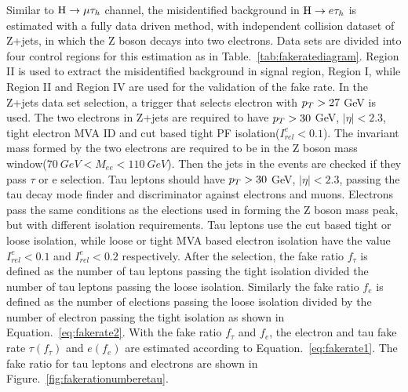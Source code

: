 Similar to $\mathrm{H}\to \mu\tau_{h}$ channel, the misidentified background in $\mathrm{H} \to e \tau_{h}$ is estimated with a fully data driven method, with independent collision dataset of Z+jets, in which the Z boson decays into two electrons.  Data sets are divided into four control regions for this estimation as in Table.~\ref{tab:fakeratediagram}. Region II is used to extract the misidentified background in signal region, Region I, while Region II and Region IV are used for the validation of the fake rate. In the Z+jets data set selection, a trigger that selects electron with $p_{T}>27$ GeV is used. The two electrons in Z+jets are required to have $p_{T}>30$ GeV, $|\eta|<2.3$, tight electron MVA ID and cut based tight PF isolation($I^{e}_{rel}<0.1$). The invariant mass formed by the two electrons are required to be in the Z boson mass window($70~GeV<M_{ee}<110~GeV$). Then the jets in the events are checked if they pass $\tau$ or e selection. Tau leptons should have $p_{T}>30$ GeV, $|\eta|<2.3$, passing the tau decay mode finder and discriminator against electrons and muons. Electrons pass the same conditions as the elections used in forming the Z boson mass peak, but with different isolation requirements. Tau leptons use the cut based tight or loose isolation, while loose or tight MVA based electron isolation have the value $I^{e}_{rel}<0.1$ and $I^{e}_{rel}<0.2$ respectively. After the selection, the fake ratio $f_{\tau}$ is defined as the number of tau leptons passing the tight isolation divided the number of tau leptons passing the loose isolation. Similarly the fake ratio $f_{e}$ is defined as the number of elections passing the loose isolation divided by the number of electron passing the tight isolation as shown in Equation.~\ref{eq:fakerate2}. With the fake ratio $f_{\tau}$ and  $f_{e}$, the electron and tau fake rate $\tau(f_{\tau})$ and $e(f_{e})$ are estimated according to Equation.~\ref{eq:fakerate1}. The fake ratio for tau leptons and electrons are shown in Figure.~\ref{fig:fakerationumberetau}. 

